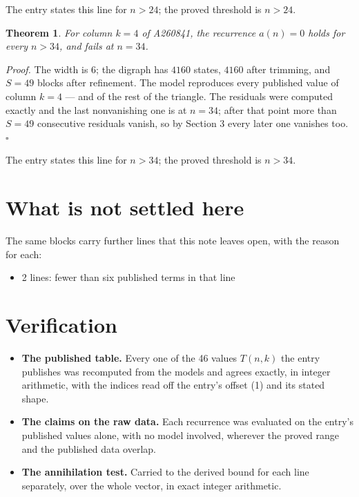 \documentclass[11pt]{article}
\newtheorem{theorem}{Theorem}
\theoremstyle{definition}
\begin{document}
The entry states this line for $n > 24$; the proved threshold is $n > 24$.

\begin{theorem} For column $k = 4$ of A260841, the recurrence $a(n) = 0$ holds for every $n > 34$, and fails at $n = 34$.\end{theorem}

{\itshape Proof.} The width is $6$; the digraph has $4160$ states, $4160$ after trimming, and $S = 49$ blocks after refinement. The model reproduces every published value of column $k = 4$ --- and of the rest of the triangle. The residuals were computed exactly and the last nonvanishing one is at $n = 34$; after that point more than $S = 49$ consecutive residuals vanish, so by Section 3 every later one vanishes too. $\square$

The entry states this line for $n > 34$; the proved threshold is $n > 34$.

\section{What is not settled here}

The same blocks carry further lines that this note leaves open, with the reason for each:

\begin{itemize}

\item 2 lines: fewer than six published terms in that line

\end{itemize}

\section{Verification}

\begin{itemize}

\item {\bfseries The published table.} Every one of the 46 values $T(n,k)$ the entry publishes was recomputed from the models and agrees exactly, in integer arithmetic, with the indices read off the entry's offset (1) and its stated shape.

\item {\bfseries The claims on the raw data.} Each recurrence was evaluated on the entry's published values alone, with no model involved, wherever the proved range and the published data overlap.

\item {\bfseries The annihilation test.} Carried to the derived bound for each line separately, over the whole vector, in exact integer arithmetic.

\end{itemize}
\end{document}
